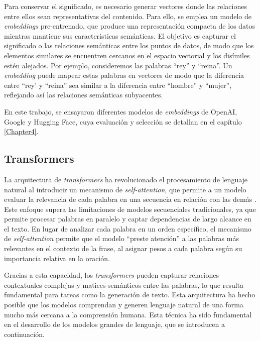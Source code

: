 Para conservar el significado, es necesario generar vectores donde las relaciones entre ellos sean representativas 
del contenido. Para ello, se emplea un modelo de \textit{embeddings} pre-entrenado, que produce una representación compacta 
de los datos mientras mantiene sus características semánticas. El objetivo es capturar el significado o las relaciones 
semánticas entre los puntos de datos, de modo que los elementos similares se encuentren cercanos en el espacio vectorial y los disímiles estén alejados. 
Por ejemplo, consideremos las palabras ``rey'' y ``reina''. Un \textit{embedding} puede mapear estas palabras en vectores de modo 
que la diferencia entre ``rey' y ``reina'' sea similar a la diferencia entre ``hombre'' y ``mujer'', reflejando así las 
relaciones semánticas subyacentes.

En este trabajo, se ensayaron diferentes modelos de \textit{embeddings} de OpenAI, Google y Hugging Face, 
cuya evaluación y selección se detallan en el capítulo \ref{Chapter4}.

\subsection{Transformers}

La arquitectura de \textit{transformers} ha revolucionado el procesamiento de lenguaje natural al introducir un mecanismo de \textit{self-attention}, 
que permite a un modelo evaluar la relevancia de cada palabra en una secuencia en relación con las demás \citep{paper:transformers}. Este enfoque 
supera las limitaciones de modelos secuenciales tradicionales, ya que permite procesar palabras en paralelo y captar dependencias de largo alcance 
en el texto. En lugar de analizar cada palabra en un orden específico, el mecanismo de \textit{self-attention} permite que el modelo ``preste atención'' 
a las palabras más relevantes en el contexto de la frase, al asignar pesos a cada palabra según su importancia relativa en la oración.

Gracias a esta capacidad, los \textit{transformers} pueden capturar relaciones contextuales complejas y matices semánticos entre las palabras, 
lo que resulta fundamental para tareas como la generación de texto. Esta arquitectura ha hecho posible que los modelos comprendan y generen 
lenguaje natural de una forma mucho más cercana a la comprensión humana. Esta técnica 
ha sido fundamental en el desarrollo de los modelos grandes de lenguaje, que se introducen a continuación.

